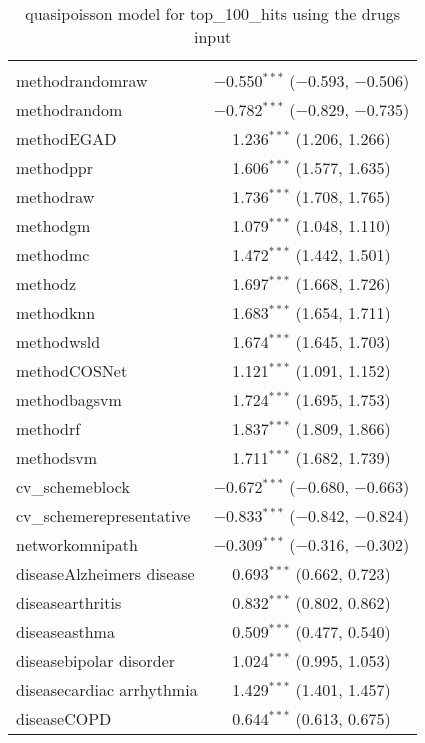 
\begin{table}[!htbp] \centering 
  \caption{quasipoisson model for top_100_hits using the drugs input} 
  \label{} 
\begin{tabular}{@{\extracolsep{5pt}}lc} 
\\[-1.8ex]\hline 
\hline \\[-1.8ex] 
 methodrandomraw & $-$0.550$^{***}$ ($-$0.593, $-$0.506) \\ 
  methodrandom & $-$0.782$^{***}$ ($-$0.829, $-$0.735) \\ 
  methodEGAD & 1.236$^{***}$ (1.206, 1.266) \\ 
  methodppr & 1.606$^{***}$ (1.577, 1.635) \\ 
  methodraw & 1.736$^{***}$ (1.708, 1.765) \\ 
  methodgm & 1.079$^{***}$ (1.048, 1.110) \\ 
  methodmc & 1.472$^{***}$ (1.442, 1.501) \\ 
  methodz & 1.697$^{***}$ (1.668, 1.726) \\ 
  methodknn & 1.683$^{***}$ (1.654, 1.711) \\ 
  methodwsld & 1.674$^{***}$ (1.645, 1.703) \\ 
  methodCOSNet & 1.121$^{***}$ (1.091, 1.152) \\ 
  methodbagsvm & 1.724$^{***}$ (1.695, 1.753) \\ 
  methodrf & 1.837$^{***}$ (1.809, 1.866) \\ 
  methodsvm & 1.711$^{***}$ (1.682, 1.739) \\ 
  cv\_schemeblock & $-$0.672$^{***}$ ($-$0.680, $-$0.663) \\ 
  cv\_schemerepresentative & $-$0.833$^{***}$ ($-$0.842, $-$0.824) \\ 
  networkomnipath & $-$0.309$^{***}$ ($-$0.316, $-$0.302) \\ 
  diseaseAlzheimers disease & 0.693$^{***}$ (0.662, 0.723) \\ 
  diseasearthritis & 0.832$^{***}$ (0.802, 0.862) \\ 
  diseaseasthma & 0.509$^{***}$ (0.477, 0.540) \\ 
  diseasebipolar disorder & 1.024$^{***}$ (0.995, 1.053) \\ 
  diseasecardiac arrhythmia & 1.429$^{***}$ (1.401, 1.457) \\ 
  diseaseCOPD & 0.644$^{***}$ (0.613, 0.675) \\ 

\end{tabular}
\end{table}
